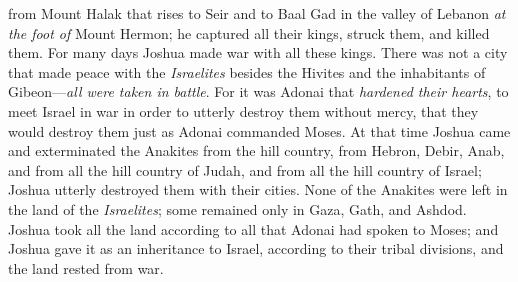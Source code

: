 \begin{biblechapter}
\verse from Mount Halak that rises to Seir and to Baal Gad in the valley of Lebanon \textit{at the foot of} Mount Hermon; he captured all their kings, struck them, and killed them.
\verse For many days Joshua made war with all these kings.
\verse There was not a city that made peace with the \textit{Israelites} besides the Hivites and the inhabitants of Gibeon—\textit{all were taken in battle}.
\verse For it was Adonai that \textit{hardened their hearts}, to meet Israel in war in order to utterly destroy them without mercy, that they would destroy them just as Adonai commanded Moses.
\verse At that time Joshua came and exterminated the Anakites from the hill country, from Hebron, Debir, Anab, and from all the hill country of Judah, and from all the hill country of Israel; Joshua utterly destroyed them with their cities.
\verse None of the Anakites were left in the land of the \textit{Israelites}; some remained only in Gaza, Gath, and Ashdod.
\verse Joshua took all the land according to all that Adonai had spoken to Moses; and Joshua gave it as an inheritance to Israel, according to their tribal divisions, and the land rested from war.
\end{biblechapter}

